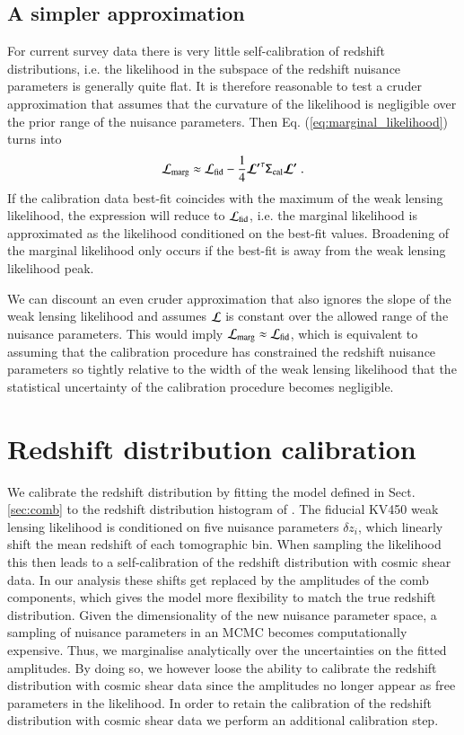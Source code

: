 \documentclass{aa}
\newcommand{\eq}[1]{\begin{equation}  #1 \end{equation}}
\begin{document}
\subsection{A simpler approximation}

For current survey data there is very little self-calibration of redshift distributions, i.e. the likelihood in the subspace of the redshift nuisance parameters is generally quite flat. It is therefore reasonable to test a cruder approximation that assumes that the curvature of the likelihood is negligible over the prior range of the nuisance parameters. Then Eq. (\ref{eq:marginal_likelihood}) turns into
\eq{
{\cal L}_{\rm marg} \approx {\cal L}_{\rm fid} - \frac{1}{4} \boldsymbol{\cal L^\prime}^\tau  \tens{\Sigma}_{\rm cal} \boldsymbol{\cal L^\prime} \;.
}
If the calibration data best-fit coincides with the maximum of the weak lensing likelihood, the expression will reduce to ${\cal L}_{\rm fid}$, i.e. the marginal likelihood is approximated as the likelihood conditioned on the best-fit values. Broadening of the marginal likelihood only occurs if the best-fit is away from the weak lensing likelihood peak.

We can discount an even cruder approximation that also ignores the slope of the weak lensing likelihood and assumes ${\cal L}$ is constant over the allowed range of the nuisance parameters. This would imply ${\cal L}_{\rm marg} \approx {\cal L}_{\rm fid}$, which is equivalent to assuming that the calibration procedure has constrained the redshift nuisance parameters so tightly relative to the width of the weak lensing likelihood that the statistical uncertainty of the calibration procedure becomes negligible.
\section{Redshift distribution calibration}
\label{sec:calibration}
We calibrate the redshift distribution by fitting the model defined in Sect. \ref{sec:comb} to the redshift distribution histogram of \cite{hildebrandt18}. The fiducial KV450 weak lensing likelihood is conditioned on five nuisance parameters $\delta z_i$, which linearly shift the mean redshift of each tomographic bin. When sampling the likelihood this then leads to a self-calibration of the redshift distribution with cosmic shear data. In our analysis these shifts get replaced by the amplitudes of the comb components, which gives the model more flexibility to match the true redshift distribution. Given the dimensionality of the new nuisance parameter space, a sampling of nuisance parameters in an MCMC becomes computationally expensive. Thus, we marginalise analytically over the uncertainties on the fitted amplitudes. By doing so, we however loose the ability to calibrate the redshift distribution with cosmic shear data since the amplitudes no longer appear as free parameters in the likelihood. In order to retain the calibration of the redshift distribution with cosmic shear data we perform an additional calibration step.
\end{document}
